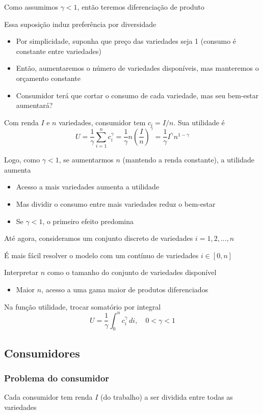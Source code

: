 \documentclass[a4paper,12pt]{article}[abntex2]
\begin{document}
Como assumimos \(\gamma < 1\), então teremos diferenciação de produto

Essa suposição induz preferência por diversidade
\begin{itemize}
    \item Por simplicidade, suponha que preço das variedades seja 1 (consumo é constante entre variedades)
    \item Então, aumentaremos o número de variedades disponíveis, mas manteremos o orçamento constante
    \item Consumidor terá que cortar o consumo de cada variedade, mas seu bem-estar aumentará?
\end{itemize}

Com renda \(I\) e \(n\) variedades, consumidor tem \(c_i = I/n\). Sua utilidade é
\[
U = \frac{1}{\gamma} \sum_{i=1}^{n} c_i^{\gamma} = \frac{1}{\gamma} n \left( \frac{I}{n} \right)^{\gamma} = \frac{1}{\gamma} I^{\gamma} n^{1 - \gamma}
\]

Logo, como \(\gamma < 1\), se aumentarmos \(n\) (mantendo a renda constante), a utilidade aumenta
\begin{itemize}
    \item Acesso a mais variedades aumenta a utilidade
    \item Mas dividir o consumo entre mais variedades reduz o bem-estar
    \item Se \(\gamma < 1\), o primeiro efeito predomina
\end{itemize}

Até agora, consideramos um conjunto discreto de variedades \(i = 1, 2, ..., n\)

É mais fácil resolver o modelo com um contínuo de variedades \(i \in [0, n]\)

Interpretar \(n\) como o tamanho do conjunto de variedades disponível
\begin{itemize}
    \item Maior \(n\), acesso a uma gama maior de produtos diferenciados
\end{itemize}

Na função utilidade, trocar somatório por integral
\[
U = \frac{1}{\gamma} \int_0^n c_i^{\gamma} \, di, \quad 0 < \gamma < 1
\]

\subsection{\textbf{Consumidores}}
\subsubsection{\textbf{Problema do consumidor}}
Cada consumidor tem renda \(I\) (do trabalho) a ser dividida entre todas as variedades
\end{document}
